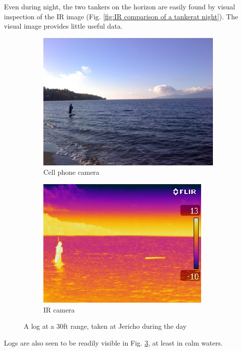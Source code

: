 Even during night, the two tankers on the horizon are easily found by visual inspection of the IR image (Fig. \ref{fig:IR comparison of a tankerat night}). The visual image provides little useful data.

\begin{figure}[H]
\centering
\begin{subfigure}{.5\textwidth}
  \centering
  \includegraphics[width=.8\linewidth]{"./image/jericho-day-log-visible"}
  \caption{Cell phone camera}
  \label{fig:sub1}
\end{subfigure}%
\begin{subfigure}{.5\textwidth}
  \centering
  \includegraphics[width=.8\linewidth]{"./image/jericho-day-log-ir"}
  \caption{IR camera}
  \label{fig:sub2}
\end{subfigure}
\caption{A log at a 30ft range, taken at Jericho during the day}
\label{fig:IR comparison of a log during the day}
\end{figure}

Logs are also seen to be readily visible in Fig. \ref{fig:IR comparison of a log during the day}, at least in calm waters.


